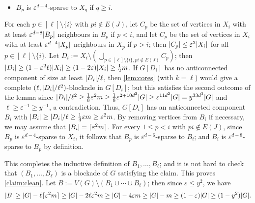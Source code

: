 \documentclass[11pt,reqno,a4paper]{amsart}
\let\oldendproof\endproof
\renewenvironment{proof}[1][\proofname]{%
	\oldproof[\normalfont\bfseries #1]%
}{\oldendproof}
\renewcommand{\qedsymbol}{$\blacksquare$}%
\newenvironment{subproof}[1][\normalfont\it Subproof]{%
	\renewcommand{\qedsymbol}{$\square$}%
	\begin{proof}[#1]%
	}{%
	\end{proof}%
}
\newcommand{\eps}{\varepsilon}
\newcommand{\nin}{\notin}
\DeclarePairedDelimiter\abs{\lvert}{\rvert}%
\DeclarePairedDelimiter\ceil{\lceil}{\rceil}%
\begin{document}
\begin{proof}
\begin{subproof}
\begin{itemize}
				\item 
				$B_p$ is $\eps^{d-4}$-sparse to $X_q$ if $q\ge i$.
			\end{itemize}
			For each $p\in[\ell]\setminus\{i\}$ with $pi\nin E(J)$, let $C_p$ be the set of vertices in $X_i$ with at least $\eps^{d-8}\abs{B_p}$ neighbours in $B_p$ if $p<i$,
			and let $C_p$ be the set of vertices in $X_i$ with at least $\eps^{d-4}\abs{X_p}$ neighbours in $X_p$ if $p>i$;
			then $\abs{C_p}\le \eps^2\abs{X_i}$ for all $p\in[\ell]\setminus\{i\}$.
			Let $D_i:=X_i\setminus(\bigcup_{p\in[\ell]\setminus\{i\},pi\nin E(J)}C_p)$;
			then $\abs{D_i}\ge (1-\eps^2\ell)\abs{X_i}\ge (1-2\eps)\abs{X_i}\ge\frac12m$.
			If $G[D_i]$ has no anticonnected component of size at least $\abs{D_i}/\ell$,
			then \cref{lem:cores} (with $k=\ell$) would give a complete $(\ell,\abs{D_i}/\ell^2)$-blockade in $G[D_i]$;
			but this satisfies the second outcome of the lemma since $\abs{D_i}/\ell^2\ge \frac18\eps^2m\ge \frac1{8}\eps^{2+10d^2}\abs G\ge \eps^{11d^2}\abs G=y^{33d^3}\abs G$ and $\ell\ge\eps^{-1}\ge y^{-1}$, a contradiction.
			Thus, $G[D_i]$ has an anticonnected component $B_i$ with $\abs{B_i}\ge\abs{D_i}/\ell\ge \frac14\eps m\ge\eps^2m$.
			By removing vertices from $B_i$ if necessary, we may assume that $\abs{B_i}=\ceil{\eps^2m}$.
			For every $1\le p<i$ with $pi\nin E(J)$, since $B_p$ is $\eps^{d-4}$-sparse to $X_i$, it follows that $B_p$ is $\eps^{d-6}$-sparse to $B_i$; and $B_i$ is $\eps^{d-8}$-sparse to $B_p$ by definition.
			
			This completes the inductive definition of $B_1,\ldots,B_{\ell}$; and it is not hard to check that $(B_1,\ldots,B_{\ell})$ is a blockade of $G$ satisfying the claim.
			This proves \cref{claim:clean}.
		\end{subproof}
		Let $B:=V(G)\setminus(B_1\cup\cdots\cup B_{\ell})$; then since $\eps\le y^2$, we have
		\[\abs B\ge \abs G-\ell\ceil{\eps^2m}
		\ge \abs G-2\ell\eps^2m
		\ge \abs G-4\eps m
		\ge \abs G-m\ge (1-\eps)\abs G\ge(1-y^2)\abs G.\]
		

\end{proof}
\end{document}
